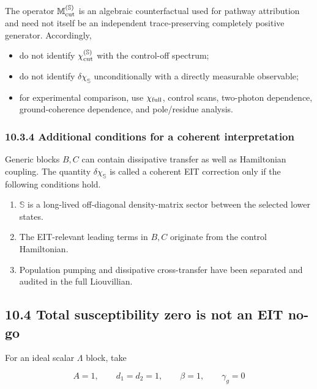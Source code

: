 \documentclass[
  10pt,
  a4paper,
]{article}
\providecommand{\tightlist}{%
  \setlength{\itemsep}{0pt}\setlength{\parskip}{0pt}}
\begin{document}
The operator \(\mathbb M_{\rm cut}^{(\mathbb S)}\) is an algebraic
counterfactual used for pathway attribution and need not itself be an
independent trace-preserving completely positive generator. Accordingly,

\begin{itemize}
\tightlist
\item
  do not identify \(\chi_{\rm cut}^{(\mathbb S)}\) with the control-off
  spectrum;
\item
  do not identify \(\delta\chi_{\mathbb S}\) unconditionally with a
  directly measurable observable;
\item
  for experimental comparison, use \(\chi_{\rm full}\), control scans,
  two-photon dependence, ground-coherence dependence, and pole/residue
  analysis.
\end{itemize}

\subsubsection{10.3.4 Additional conditions for a coherent
interpretation}\label{additional-conditions-for-a-coherent-interpretation}

Generic blocks \(B,C\) can contain dissipative transfer as well as
Hamiltonian coupling. The quantity \(\delta\chi_{\mathbb S}\) is called
a coherent EIT correction only if the following conditions hold.

\begin{enumerate}
\def\labelenumi{\arabic{enumi}.}
\tightlist
\item
  \(\mathbb S\) is a long-lived off-diagonal density-matrix sector
  between the selected lower states.
\item
  The EIT-relevant leading terms in \(B,C\) originate from the control
  Hamiltonian.
\item
  Population pumping and dissipative cross-transfer have been separated
  and audited in the full Liouvillian.
\end{enumerate}

\subsection{10.4 Total susceptibility zero is not an EIT
no-go}\label{total-susceptibility-zero-is-not-an-eit-no-go}

For an ideal scalar \(\Lambda\) block, take

\[
A=1,
\qquad
d_1=d_2=1,
\qquad
\beta=1,
\qquad
\gamma_g=0
\]
\end{document}
